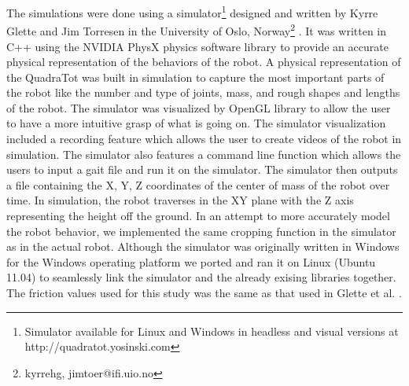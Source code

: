 The simulations were done using a simulator\footnote{Simulator available for Linux and Windows in headless and visual versions at http://quadratot.yosinski.com} designed and written by Kyrre Glette and Jim Torresen in the University of Oslo, Norway\footnote{{kyrrehg, jimtoer}@ifi.uio.no} \cite{glette}. 
It was written in C++ using the NVIDIA PhysX physics software library to provide an accurate physical representation of the behaviors of the robot. 
A physical representation of the QuadraTot was built in simulation to capture the most important parts of the robot like the number and type of joints, mass, and rough shapes and lengths of the robot. 
The simulator was visualized by OpenGL library to allow the user to have a more intuitive grasp of what is going on. 
The simulator visualization included a recording feature which allows the user to create videos of the robot in simulation.
The simulator also features a command line function which allows the users to input a gait file and run it on the simulator. 
The simulator then outputs a file containing the X, Y, Z coordinates of the center of mass of the robot over time. 
In simulation, the robot traverses in the XY plane with the Z axis representing the height off the ground. 
In an attempt to more accurately model the robot behavior, we implemented the same cropping function in the simulator as in the actual robot. 
Although the simulator was originally written in Windows for the Windows operating platform we ported and ran it on Linux (Ubuntu 11.04) to seamlessly link the simulator and the already exising libraries together. 
The friction values used for this study was the same as that used in Glette et al. \cite{glette}. 
%
%

